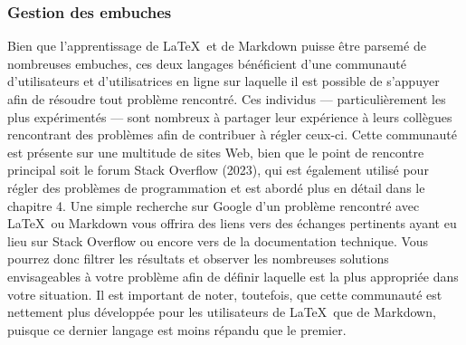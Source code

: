 \documentclass[
  letterpaper,
]{scrbook}
\begin{document}
\hypertarget{gestion-des-embuches}{%
\subsubsection{Gestion des embuches}\label{gestion-des-embuches}}

Bien que l'apprentissage de \LaTeX~et de Markdown puisse être parsemé de
nombreuses embuches, ces deux langages bénéficient d'une communauté
d'utilisateurs et d'utilisatrices en ligne sur laquelle il est possible
de s'appuyer afin de résoudre tout problème rencontré. Ces individus ---
particulièrement les plus expérimentés --- sont nombreux à partager leur
expérience à leurs collègues rencontrant des problèmes afin de
contribuer à régler ceux-ci. Cette communauté est présente sur une
multitude de sites Web, bien que le point de rencontre principal soit le
forum Stack Overflow (2023), qui est également utilisé pour régler des
problèmes de programmation et est abordé plus en détail dans le chapitre
4. Une simple recherche sur Google d'un problème rencontré avec
\LaTeX~ou Markdown vous offrira des liens vers des échanges pertinents
ayant eu lieu sur Stack Overflow ou encore vers de la documentation
technique. Vous pourrez donc filtrer les résultats et observer les
nombreuses solutions envisageables à votre problème afin de définir
laquelle est la plus appropriée dans votre situation. Il est important
de noter, toutefois, que cette communauté est nettement plus développée
pour les utilisateurs de \LaTeX~que de Markdown, puisque ce dernier
langage est moins répandu que le premier.
\end{document}
